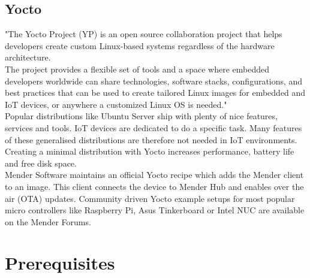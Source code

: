 \subsection{Yocto}
"The Yocto Project (YP) is an open source collaboration project that helps developers create custom Linux-based systems regardless of the hardware architecture.\\
The project provides a flexible set of tools and a space where embedded developers worldwide can share technologies, software stacks, configurations, and best practices that can be used to create tailored Linux images for embedded and IoT devices, or anywhere a customized Linux OS is needed."\cite{yoctoproject}\\
Popular distributions like Ubuntu Server ship with plenty of nice features, services and tools. IoT devices are dedicated to do a specific task. Many features of these generalised distributions are therefore not needed in IoT environments. Creating a minimal distribution with Yocto increases performance, battery life and free disk space.\\
Mender Software maintains an official Yocto recipe which adds the Mender client to an image. This client connects the device to Mender Hub and enables over the air (OTA) updates. Community driven Yocto example setups for most popular micro controllers like Raspberry Pi, Asus Tinkerboard or Intel NUC are available on the Mender Forums.

\section{Prerequisites}
